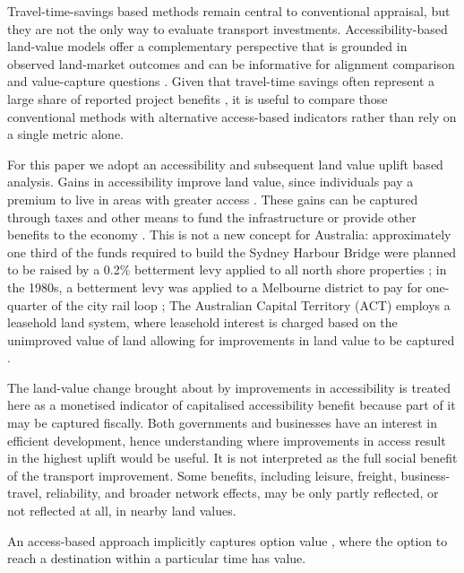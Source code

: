 \documentclass[preprint,12pt,authoryear]{elsarticle}
\begin{document}
{Travel-time-savings based methods remain central to conventional appraisal, but they are not the only way to evaluate transport investments. Accessibility-based land-value models offer a complementary perspective that is grounded in observed land-market outcomes and can be informative for alignment comparison and value-capture questions \parencite{Wang_Levinson_2022}. Given that travel-time savings often represent a large share of reported project benefits \parencite{Douglas2018}, it is useful to compare those conventional methods with alternative access-based indicators rather than rely on a single metric alone.}

For this paper we adopt an accessibility and subsequent land value uplift based analysis.  Gains in accessibility improve land value, since individuals pay a premium to live in areas with greater access \parencite{levinson2020b}. These gains can be captured through taxes and other means to fund the infrastructure or provide other benefits to the economy \parencite{levinson2019}. This is not a new concept for Australia: approximately one third of the funds required to build the Sydney Harbour Bridge were planned to be raised by a 0.2\% betterment levy applied to all north shore properties \parencite{burke2016problems}; in the 1980s, a betterment levy was applied to a Melbourne district to pay for one-quarter of the city rail loop \parencite{burke2016problems}; The Australian Capital Territory (ACT) employs a leasehold land system, where leasehold interest is charged based on the unimproved value of land allowing for improvements in land value to be captured \parencite{Mangioni2016}. 

{The land-value change brought about by improvements in accessibility is treated here as a monetised indicator of capitalised accessibility benefit because part of it may be captured fiscally. {Both governments and businesses have an interest in efficient development, hence understanding where improvements in access result in the highest uplift would be useful.} It is not interpreted as the full social benefit of the transport improvement. Some benefits, including leisure, freight, business-travel, reliability, and broader network effects, may be only partly reflected, or not reflected at all, in nearby land values.}

An access-based approach implicitly captures option value \parencite{Wang_Levinson_2022, MANN2024}, where  the option to reach a destination within a particular time  has value.

\end{document}
